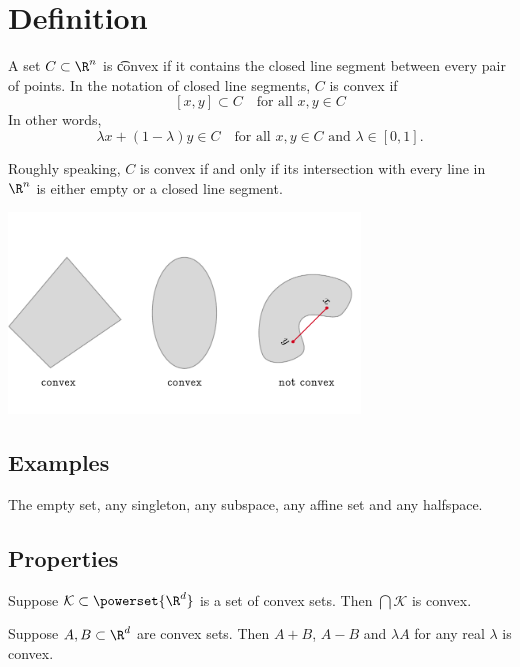 
\section*{Definition}

A set $C \subset \R ^n$ is \t{convex} if it contains the closed line segment between every pair of points.
In the notation of closed line segments, $C$ is convex if
\[
[x, y] \subset C \quad \text{for all } x, y \in C
\]
In other words,
\[
\lambda x + (1-\lambda )y \in C \quad \text{for all } x, y \in C \text{ and } \lambda  \in [0,1].
\]

Roughly speaking, $C$ is convex if and only if its intersection with every line in $\R ^n$ is either empty or a closed line segment.

\begin{center}\includegraphics[width=0.70\textwidth]{./graphics/convex_sets.pdf}\end{center}
\subsection*{Examples}

The empty set, any singleton, any subspace, any affine set and any halfspace.

\subsection*{Properties}

\begin{proposition}
Suppose $\mathcal{K}  \subset \powerset{\R ^d}$ is a set of convex sets.
Then $\bigcap\mathcal{K} $ is convex.
\end{proposition}

\begin{proposition}
Suppose $A, B \subset \R ^d$ are convex sets.
Then $A + B$, $A - B$ and $\lambda A$ for any real $\lambda $ is convex.
\end{proposition}

